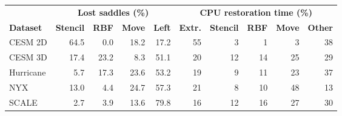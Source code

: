 \begin{tabular}{@{}lrrrrrrrrr@{}}
\toprule
 & \multicolumn{4}{c}{\textbf{Lost saddles (\%)}} & \multicolumn{5}{c}{\textbf{CPU restoration time (\%)}} \\
\cmidrule(lr){2-5}\cmidrule(lr){6-10}
\textbf{Dataset} & \textbf{Stencil} & \textbf{RBF} & \textbf{Move} & \textbf{Left} & \textbf{Extr.} & \textbf{Stencil} & \textbf{RBF} & \textbf{Move} & \textbf{Other} \\
\midrule
CESM 2D & 64.5 & 0.0 & 18.2 & 17.2 & 55 & 3 & 1 & 3 & 38 \\
CESM 3D & 17.4 & 23.2 & 8.3 & 51.1 & 20 & 12 & 14 & 25 & 29 \\
Hurricane & 5.7 & 17.3 & 23.6 & 53.2 & 19 & 9 & 11 & 23 & 37 \\
NYX & 13.0 & 4.4 & 24.7 & 57.3 & 21 & 8 & 10 & 48 & 13 \\
SCALE & 2.7 & 3.9 & 13.6 & 79.8 & 16 & 12 & 16 & 27 & 30 \\
\bottomrule
\end{tabular}
